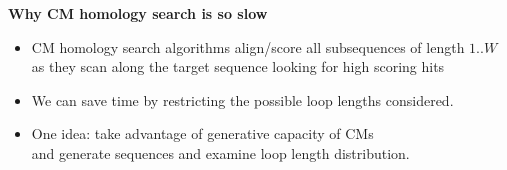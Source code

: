 \documentclass[landscape]{slides}
\begin{document}
\begin{slide}
\begin{center}
\textbf{Why CM homology search is so slow}
\end{center}

\medskip
\small
\begin{itemize}

\item
CM homology search algorithms align/score all subsequences of length
$1..W$ \\ as they scan along the target sequence
looking for high scoring hits
\end{itemize}


\begin{itemize}
\item
  We can save time by restricting the possible loop lengths
  considered.
\item
  One idea: take advantage of generative capacity of CMs \\ and generate
  sequences and examine loop length distribution.
\end{itemize}

\vfill
\end{slide}
%
\end{document}
